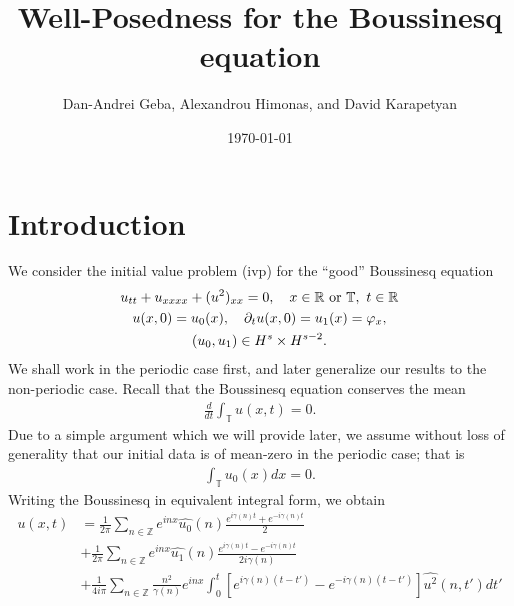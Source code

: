 \documentclass[12pt,reqno]{amsart}
\numberwithin{equation}{section}  %
\newcommand{\rr}{\mathbb{R}}
\newcommand{\zz}{\mathbb{Z}}
\newcommand{\ci}{\mathbb{T}}
\newcommand{\wh}{\widehat}
\newcommand{\p}{\partial}
\newcommand{\vp}{\varphi}
\begin{document}
\title{Well-Posedness for the Boussinesq equation}
\author{Dan-Andrei Geba, Alexandrou Himonas, and David Karapetyan}
\address{Department of Mathematics, University of Rochester, Rochester, NY 14627}
\address{Department of Mathematics, University of Notre Dame, Notre Dame, IN 46556}
\address{Department of Mathematics, University of Notre Dame, Notre Dame, IN 46556}
\date{\today}
%
%
\maketitle
\tableofcontents
%
%
\section{Introduction}
%
We consider the initial value problem (ivp) for the ``good'' Boussinesq
equation 
\begin{gather}
  u_{tt} + u_{xxxx} + (u^2)_{xx} = 0, \quad x \in \rr \ \text{or} \
  \ci, \ t \in \rr
  \label{eqn:mb-2}
  \\
  u(x,0) = u_{0}(x), \quad \p_t u(x, 0) = u_{1}(x)= \vp_{x}, 
  \label{eqn:mb-init-data-2}
  \\
  \notag
  (u_0, u_1) \in
  H^{s}\times
  H^{s-2}.
\end{gather}
%
%
We shall work in the periodic case first, and later generalize our results to
the non-periodic case. Recall that the Boussinesq equation conserves the mean
%
%
\begin{equation*}
\begin{split}
\frac{d}{dt} \int_{\ci} u(x,t) = 0.
\end{split}
\end{equation*}
%
%
Due to a simple argument which we will provide later, we assume without loss of generality that our initial data is of mean-zero in the periodic case; that is 
%
%
\begin{equation*}
\begin{split}
\int_{\ci} u_{0}(x) dx = 0.
\end{split}
\end{equation*}
%
%
Writing the Boussinesq in equivalent integral form, we obtain 
%
\begin{equation}
  \begin{split}
    u(x,t)
    & = \frac{1}{2\pi}\sum_{n \in \zz} e^{inx} \wh{u_{0}}(n) \frac{e^{i\gamma(n)t} + e^{-i\gamma(n)t}}{2} 
    \\
    & + \frac{1}{2 \pi}\sum_{n \in \zz} e^{inx}
    \wh{u_{1}}(n)\frac{e^{i\gamma(n)t} - e^{-i\gamma(n)t}}{2 i \gamma(n)} 
    \\
    & + \frac{1}{4 i \pi}\sum_{n \in \zz} \frac{n^{2}}{\gamma(n)} e^{inx}
    \int_{0}^{t}[e^{i\gamma(n)(t-t')}-e^{-i\gamma(n)(t-t')}]
    \wh{u^{2}}(n, t') dt'
  \end{split}
  \label{eqn:integral-form}
\end{equation}
\end{document}
